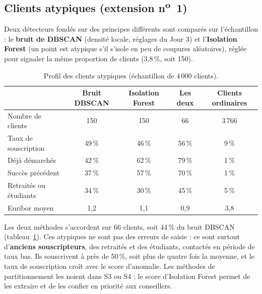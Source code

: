 \documentclass[11pt,a4paper]{article}
\begin{document}
\subsection{Clients atypiques (extension n\textsuperscript{o}~1)}
Deux détecteurs fondés sur des principes différents sont comparés sur l'échantillon : le \textbf{bruit de DBSCAN} (densité locale, réglages du Jour 3) et l'\textbf{Isolation Forest} (un point est atypique s'il s'isole en peu de coupures aléatoires), réglée pour signaler la même proportion de clients (3,8\,\%, soit 150).

\begin{table}[H]\centering\small
\caption{Profil des clients atypiques (échantillon de 4\,000 clients).}\label{tab:atyp}
\begin{tabular}{|l|c|c|c|c|}
\hline
 & \textbf{Bruit DBSCAN} & \textbf{Isolation Forest} & \textbf{Les deux} & \textbf{Clients ordinaires}\\ \hline
Nombre de clients          & 150 & 150 & 66 & 3\,766\\ \hline
Taux de souscription       & 49\,\% & 46\,\% & 56\,\% & 9\,\%\\ \hline
Déjà démarchés             & 42\,\% & 62\,\% & 79\,\% & 1\,\%\\ \hline
Succès précédent           & 37\,\% & 57\,\% & 70\,\% & 1\,\%\\ \hline
Retraités ou étudiants     & 34\,\% & 30\,\% & 45\,\% & 5\,\%\\ \hline
Euribor moyen              & 1,2 & 1,1 & 0,9 & 3,8\\ \hline
\end{tabular}
\end{table}

Les deux méthodes s'accordent sur 66 clients, soit 44\,\% du bruit DBSCAN (tableau~\ref{tab:atyp}). Ces atypiques ne sont pas des erreurs de saisie : ce sont surtout d'\textbf{anciens souscripteurs}, des retraités et des étudiants, contactés en période de taux bas. Ils souscrivent à près de 50\,\%, soit plus de quatre fois la moyenne, et le taux de souscription croît avec le score d'anomalie. Les méthodes de partitionnement les noient dans S3 ou S4 ; le score d'Isolation Forest permet de les extraire et de les confier en priorité aux conseillers.
\end{document}
